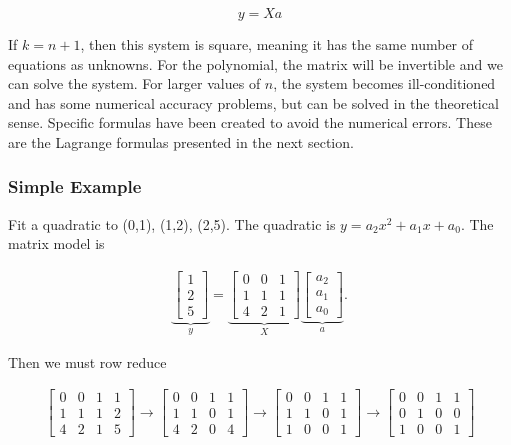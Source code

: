 \[y = Xa\]

If \(k = n+1\), then this system is square, meaning it has the same
number of equations as unknowns. For the polynomial, the matrix will be
invertible and we can solve the system. For larger values of \(n\), the
system becomes ill-conditioned and has some numerical accuracy problems,
but can be solved in the theoretical sense. Specific formulas have been
created to avoid the numerical errors. These are the Lagrange formulas
presented in the next section.

\hypertarget{simple-example}{%
\subsubsection{Simple Example}\label{simple-example}}

Fit a quadratic to (0,1), (1,2), (2,5). The quadratic is
\(y = a_2 x^2 + a_1 x + a_0\). The matrix model is

\[\begin{aligned}
\underbrace{\begin{bmatrix} 1 \\[3mm] 2 \\[3mm] 5 \end{bmatrix}}_y =
\underbrace{ \begin{bmatrix}
0 & 0  & 1 \\[3mm]
1 & 1 &  1 \\[3mm]
4 & 2 & 1
\end{bmatrix} }_X
\underbrace{\begin{bmatrix}
a_2 \\[3mm] a_1 \\[3mm] a_0
\end{bmatrix}}_a     .
\end{aligned}\]

Then we must row reduce

\[\begin{aligned}
\begin{bmatrix}
0 & 0  & 1 & 1\\[3mm]
1 & 1 &  1 & 2 \\[3mm]
4 & 2 & 1  & 5
\end{bmatrix}
\to
\begin{bmatrix}
0 & 0  & 1 & 1\\[3mm]
1 & 1 &  0 & 1 \\[3mm]
4 & 2 & 0  & 4
\end{bmatrix}
\to
\begin{bmatrix}
0 & 0  & 1 & 1\\[3mm]
1 & 1 &  0 & 1 \\[3mm]
1 & 0 & 0  & 1
\end{bmatrix}
\to
\begin{bmatrix}
0 & 0  & 1 & 1\\[3mm]
0 & 1 &  0 & 0 \\[3mm]
1 & 0 & 0  & 1
\end{bmatrix}
\end{aligned}\]

